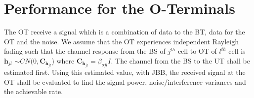 \documentclass[10pt, a4paper, twoside,fleqn]{article}
\begin{document}

\section{Performance for the O-Terminals}
	The OT receive a signal which is a combination of data to the BT, data for the OT and the noise. We assume that the OT experiences independent Rayleigh fading such that the channel response from the BS of $j^{th}$ cell to OT of $l^{th}$ cell is $\pmb{h}_{jl}$ $\sim CN(0,\pmb{C}_{\pmb{h}_{jl}}$) where $\pmb{C}_{\pmb{h}_{jl}} = \beta_{ojl}I$. The channel from the BS to the UT shall be estimated first. Using this estimated value, with JBB, the received signal at the OT shall be evaluated to find the signal power, noise/interference variances and the achievable rate.
\end{document}
